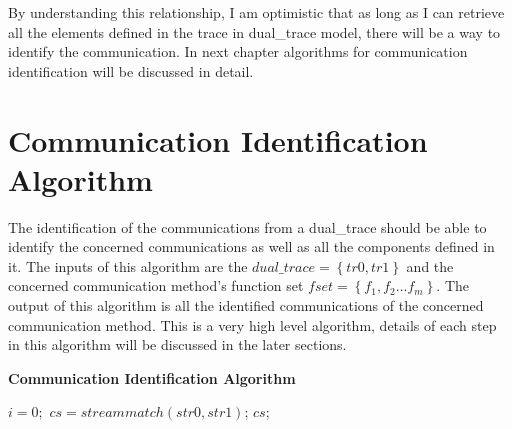 By understanding this relationship, I am optimistic that as long as I can retrieve all the elements defined in the trace in dual\_trace model, there will be a way to identify the communication. In next chapter algorithms for communication identification will be discussed in detail. 


\section{Communication Identification Algorithm}
The identification of the communications from a dual\_trace should be able to identify the concerned communications as well as all the components defined in it. The inputs of this algorithm are the $dual\_trace=\left\lbrace tr0, tr1 \right\rbrace $ and the concerned communication method's function set $fset = \left \lbrace f_1,f_2...f_m \right\rbrace $. The output of this algorithm is all the identified communications of the concerned communication method. This is a very high level algorithm, details of each step in this algorithm will be discussed in the later sections.\par
\begin{algorithm}[H]
\DontPrintSemicolon
\caption{{\bf Communication Identification Algorithm} \label{endpointIdentAlg}}
$i = 0;$\;
$cs = streammatch(str0, str1)$;\;
\KwRet $cs$;\;
\end{algorithm} 
